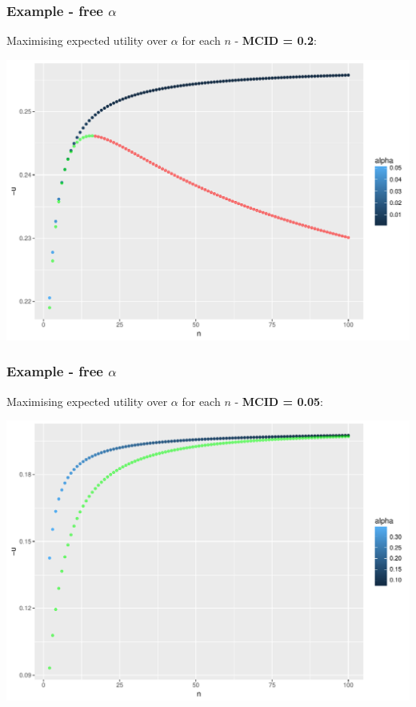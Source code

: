 \documentclass{beamer}
\begin{document}
\begin{frame}
\frametitle{Example - free $\alpha$}
Maximising expected utility over $\alpha$ for each $n$ - \textbf{MCID = 0.2}:

\centering
\includegraphics[scale=0.4]{free_a_2}
\end{frame}

\begin{frame}
\frametitle{Example - free $\alpha$}
Maximising expected utility over $\alpha$ for each $n$ - \textbf{MCID = 0.05}:

\centering
\includegraphics[scale=0.4]{free_a_05}
\end{frame}
\end{document}
